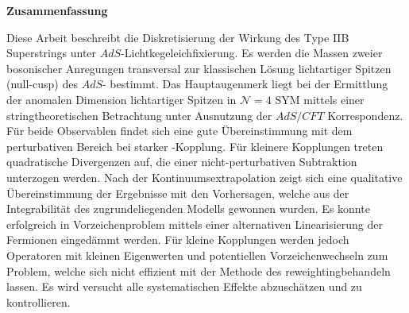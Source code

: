 %
\begin{center}
{\sffamily \bfseries\Large Zusammenfassung}\\
\end{center}%
\vspace{1cm}
%
Diese Arbeit beschreibt die Diskretisierung der Wirkung des Type IIB  Superstrings unter $AdS$-Lichtkegeleichfixierung. Es werden die Massen zweier bosonischer Anregungen transversal zur klassischen Lösung lichtartiger Spitzen (null-cusp) des $AdS$- bestimmt. Das Hauptaugenmerk liegt bei der Ermittlung der anomalen Dimension lichtartiger Spitzen in $\mathcal{N}=4$ SYM mittels einer stringtheoretischen Betrachtung unter Ausnutzung der \linebreak $AdS/CFT$ Korrespondenz. Für beide Observablen findet sich eine gute Übereinstimmung mit dem perturbativen Bereich bei starker -Kopplung. Für kleinere Kopplungen treten quadratische Divergenzen auf, die einer nicht-perturbativen Subtraktion unterzogen werden. Nach der Kontinuumsextrapolation zeigt sich eine qualitative Übereinstimmung der Ergebnisse mit den Vorhersagen, welche aus der Integrabilität des zugrundeliegenden Modells gewonnen wurden. Es konnte erfolgreich in Vorzeichenproblem mittels einer alternativen Linearisierung der Fermionen eingedämmt werden. Für kleine Kopplungen werden jedoch Operatoren mit kleinen Eigenwerten und potentiellen Vorzeichenwechseln zum Problem, welche sich nicht effizient mit der Methode des \glqq reweighting\grqq{ }behandeln lassen. Es wird versucht alle systematischen Effekte abzuschätzen und zu kontrollieren.
